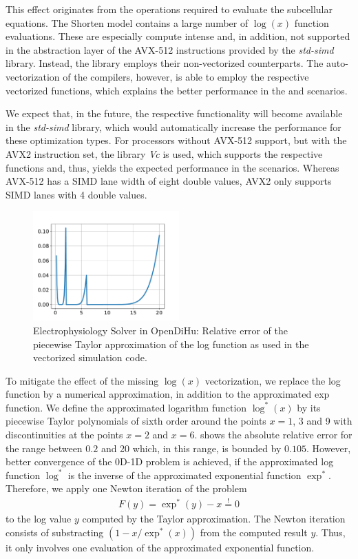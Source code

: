 This effect originates from the operations required to evaluate the subcellular equations. The Shorten model contains a large number of $\log(x)$ function evaluations. These are especially compute intense and, in addition, not supported in the abstraction layer of the AVX-512 instructions provided by the \emph{std-simd} library. Instead, the library employs their non-vectorized counterparts. The auto-vectorization of the compilers, however, is able to employ the respective vectorized functions, which explains the better performance in the  and  scenarios. 

We expect that, in the future, the respective functionality will become available in the \emph{std-simd} library, which would automatically increase the performance for these optimization types. For processors without AVX-512 support, but with the AVX2 instruction set, the library \emph{Vc} is used, which supports the respective functions and, thus, yields the expected performance in the  scenarios. Whereas AVX-512 has a SIMD lane width of eight double values, AVX2 only supports SIMD lanes with 4 double values.

\begin{figure}
  \centering%
  \includegraphics[width=0.5\textwidth]{images/results/studies/apxlog.pdf}%
  \caption{Electrophysiology Solver in OpenDiHu: Relative error of the piecewise Taylor approximation of the log function as used in the vectorized simulation code.}%
  \label{fig:apxlog}%
\end{figure}%
To mitigate the effect of the missing $\log(x)$ vectorization, we replace the log function by a numerical approximation, in addition to the approximated exp function. We define the approximated logarithm function $\log^\ast(x)$ by its piecewise Taylor polynomials of sixth order around the points $x=1$, 3 and 9 with discontinuities at the points $x=2$ and $x=6$.  shows the absolute relative error for the range between $0.2$ and 20 which, in this range, is bounded by $0.105$. However, better convergence of the 0D-1D problem is achieved, if the approximated log function $\log^\ast$ is the inverse of the approximated exponential function $\exp^\ast$. Therefore, we apply one Newton iteration of the problem %
\begin{align*}
  F(y) = \exp^\ast(y)-x \overset{!}{=} 0  
\end{align*}
%
to the log value $y$ computed by the Taylor approximation. The Newton iteration consists of substracting ${(1 - x/\exp^\ast(x))}$ from the computed result $y$. Thus, it only involves one evaluation of the approximated exponential function.

